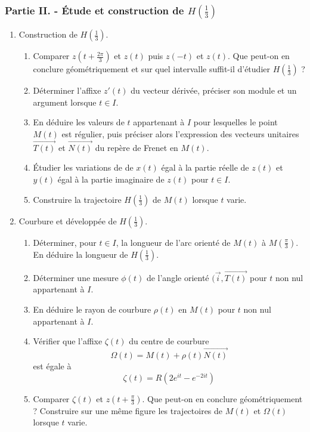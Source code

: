 \subsubsection*{Partie II. - {\'E}tude et construction de $H(\frac{1}{3})$}
\begin{enumerate}
\item Construction de $H(\frac{1}{3})$.

\begin{enumerate}
\item Comparer $z(t+\frac{2\pi}{3})$ et $z(t)$ puis $z(-t)$ et $z(t)$. Que peut-on en conclure géométriquement et sur quel intervalle suffit-il d'étudier $H(\frac{1}{3})$ ?
\item Déterminer l'affixe $z'(t)$ du vecteur dérivée, préciser son module et un argument lorsque $t\in I$.
\item En déduire les valeurs de $t$ appartenant à $I$ pour lesquelles le point $M(t)$ est régulier, puis préciser alors l'expression des vecteurs unitaires $\overrightarrow{T(t)}$ et $\overrightarrow{N(t)}$ du repère de Frenet en $M(t)$. \item {\'E}tudier les variations de de $x(t)$ égal à la partie réelle de $z(t)$ et $y(t)$ égal à la partie imaginaire de $z(t)$ pour $t\in I$.
\item Construire la trajectoire $H(\frac{1}{3})$ de $M(t)$ lorsque $t$ varie.
\end{enumerate}
\item Courbure et développée de  $H(\frac{1}{3})$.

\begin{enumerate}
\item Déterminer, pour $t\in I$, la longueur de l'arc orienté de $M(t)$ à $M(\frac{\pi}{3})$. En déduire la longueur de $H(\frac{1}{3})$.
\item Déterminer une mesure $\phi (t)$ de l'angle orienté $(\overrightarrow{i},\overrightarrow{T(t)}$ pour $t$ non nul appartenant à $I$.
\item En déduire le rayon de courbure $\rho(t)$ en $M(t)$ pour $t$ non nul appartenant à $I$.
\item Vérifier que l'affixe $\zeta(t)$ du centre de courbure
\[\Omega(t) = M(t) + \rho(t) \overrightarrow{N(t)}\]
est égale à
\[\zeta(t)=R(2e^{it}-e^{-2it})\]
\item Comparer $\zeta(t)$ et $z(t+\frac{\pi}{3})$. Que peut-on en conclure géométriquement ? Construire sur une même figure les trajectoires de $M(t)$ et $\Omega(t)$ lorsque $t$ varie.
\end{enumerate} 
\end{enumerate} 

